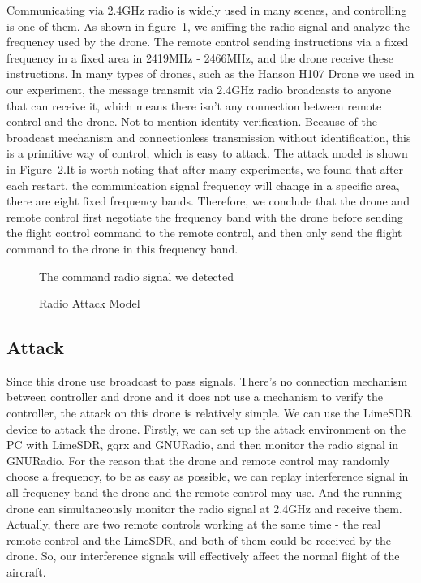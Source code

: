 \documentclass{acm_proc_article-sp}
\begin{document}
Communicating via 2.4GHz radio is widely used in many scenes, and controlling is one of them. As shown in figure~\ref{gqrx}, we sniffing the radio signal and analyze the frequency used by the drone. The remote control sending instructions via a fixed frequency in a fixed area in 2419MHz - 2466MHz, and the drone receive these instructions. In many types of drones, such as the Hanson H107 Drone we used in our experiment, the message transmit via 2.4GHz radio broadcasts to anyone that can receive it, which means there isn't any connection between remote control and the drone. Not to mention identity verification. Because of the broadcast mechanism and connectionless transmission without identification, this is a primitive way of control, which is easy to attack. The attack model is shown in Figure~\ref{radio}.It is worth noting that after many experiments, we found that after each restart, the communication signal frequency will change in a specific area, there are eight fixed frequency bands. Therefore, we conclude that the drone and remote control first negotiate the frequency band with the drone before sending the flight control command to the remote control, and then only send the flight command to the drone in this frequency band.


\begin{figure}
\centering
{}
\caption{The command radio signal we detected}
\label{gqrx}
\end{figure}

\begin{figure}
\centering
{}
\caption{Radio Attack Model}
\label{radio}
\end{figure}

\subsection{Attack}


Since this drone use broadcast to pass signals. There's no connection mechanism between controller and drone and it does not use a mechanism to verify the controller, the attack on this drone is relatively simple. We can use the LimeSDR device to attack the drone. Firstly, we can set up the attack environment on the PC with LimeSDR, gqrx and GNURadio, and then monitor the radio signal in GNURadio. For the reason that the drone and remote control may randomly choose a frequency, to be as easy as possible, we can replay interference signal in all frequency band the drone and the remote control may use. And the running drone can simultaneously monitor the radio signal at 2.4GHz and receive them. Actually, there are two remote controls working at the same time - the real remote control and the LimeSDR, and both of them could be received by the drone. So, our interference signals will effectively affect the normal flight of the aircraft.
\end{document}
